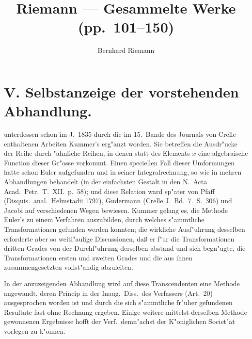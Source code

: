 \documentclass[12pt,a4paper]{article}
\title{\textbf{Riemann --- Gesammelte Werke (pp.\ 101--150)}}
\author{Bernhard Riemann}
\date{}
\begin{document}
\maketitle
\thispagestyle{empty}
\tableofcontents
\newpage

\section*{V. Selbstanzeige der vorstehenden Abhandlung.}
\label{sec:selbstanzeige}

unterdessen schon im J.\ 1835 durch die im 15.\ Bande des Journals
von Crelle enthaltenen Arbeiten Kummer's erg"anzt worden. Sie betreffen
die Ausdr"ucke der Reihe durch "ahnliche Reihen, in denen statt
des Elements $x$ eine algebraische Function dieser Gr"osse vorkommt.
Einen speciellen Fall dieser Umformungen hatte schon Euler aufgefunden
und in seiner Integralrechnung, so wie in mehren Abhandlungen behandelt
(in der einfachsten Gestalt in den N.\ Acta Acad.\ Petr.\ T.\ XII.\ p.\ 58);
und diese Relation ward sp"ater von Pfaff (Disquis.\ anal.\ Helmstadii
1797), Gudermann (Crelle J.\ Bd.\ 7.\ S.\ 306) und Jacobi auf
verschiedenen Wegen bewiesen. Kummer gelang es, die Methode Euler's
zu einem Verfahren auszubilden, durch welches s"ammtliche Transformationen
gefunden werden konnten; die wirkliche Ausf"uhrung desselben erforderte
aber so weitl"aufige Discussionen, da\ss{} er f"ur die Transformationen
dritten Grades von der Durchf"uhrung derselben abstand und sich begn"ugte,
die Transformationen ersten und zweiten Grades und die aus ihnen
zusammengesetzten vollst"andig abzuleiten.

In der anzuzeigenden Abhandlung wird auf diese Transcendenten eine
Methode angewandt, deren Princip in der Inaug.\ Diss.\ des Verfassers
(Art.\ 20) ausgesprochen worden ist und durch die sich s"ammtliche
fr"uher gefundenen Resultate fast ohne Rechnung ergeben. Einige weitere
mittelst derselben Methode gewonnenen Ergebnisse hofft der Verf.\ demn"achst
der K"oniglichen Societ"at vorlegen zu k"onnen.

\newpage
\end{document}
